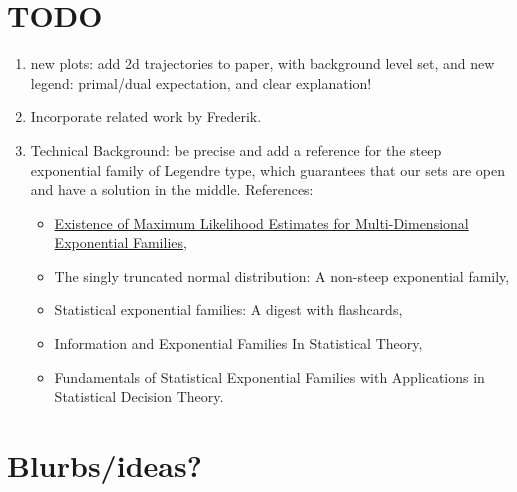 \documentclass[twoside]{article}
\begin{document}
\section{TODO}
\begin{enumerate}
	\item new plots: add 2d trajectories to paper, with background level set, and new legend: primal/dual expectation, and clear explanation!
	\item Incorporate related work by Frederik.
	\item Technical Background: be precise and add a reference for the steep exponential family of Legendre type, which guarantees that our sets are open and have a solution in the middle.
	References: \begin{itemize}
		\item \href{https://www.jstor.org/stable/4616462?seq=1#metadata_info_tab_contents}{Existence of Maximum Likelihood Estimates for Multi-Dimensional Exponential Families},
		\item The singly truncated normal distribution: A non-steep exponential family,
		\item Statistical exponential families: A digest with flashcards,
		\item Information and Exponential Families In Statistical Theory,
		\item Fundamentals of Statistical Exponential Families with Applications in Statistical Decision Theory.
	\end{itemize}
\end{enumerate}




\section{Blurbs/ideas?}
\end{document}
